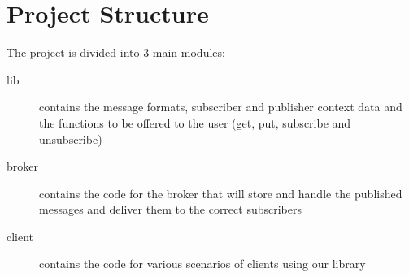 \section{Project Structure}
\label{sec:Project-Structure}

The project is divided into 3 main modules:

\begin{description}
    \item[lib] contains the message formats, subscriber and publisher context data and the functions to be offered to the user (get, put, subscribe and unsubscribe)
    \item[broker] contains the code for the broker that will store and handle the published messages and deliver them to the correct subscribers
    \item[client] contains the code for various scenarios of clients using our library 
\end{description}

